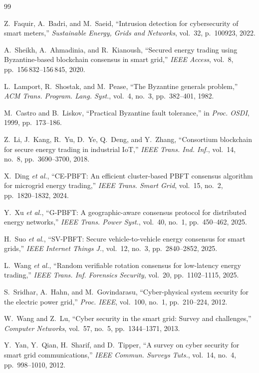 \documentclass[10pt,twocolumn,journal]{IEEEtran}
\begin{document}
\begin{thebibliography}{99}

Z.~Faquir, A.~Badri, and M.~Saeid, ``Intrusion detection for cybersecurity of smart meters,'' \emph{Sustainable Energy, Grids and Networks}, vol.~32, p.~100923, 2022.

A.~Sheikh, A.~Ahmadinia, and R.~Kianoush, ``Secured energy trading using Byzantine-based blockchain consensus in smart grid,'' \emph{IEEE Access}, vol.~8, pp.~156\,832--156\,845, 2020.

L.~Lamport, R.~Shostak, and M.~Pease, ``The Byzantine generals problem,'' \emph{ACM Trans. Program. Lang. Syst.}, vol.~4, no.~3, pp.~382--401, 1982.

M.~Castro and B.~Liskov, ``Practical Byzantine fault tolerance,'' in \emph{Proc. OSDI}, 1999, pp.~173--186.

Z.~Li, J.~Kang, R.~Yu, D.~Ye, Q.~Deng, and Y.~Zhang, ``Consortium blockchain for secure energy trading in industrial IoT,'' \emph{IEEE Trans. Ind. Inf.}, vol.~14, no.~8, pp.~3690--3700, 2018.

X.~Ding \emph{et al.}, ``CE-PBFT: An efficient cluster-based PBFT consensus algorithm for microgrid energy trading,'' \emph{IEEE Trans. Smart Grid}, vol.~15, no.~2, pp.~1820--1832, 2024.

Y.~Xu \emph{et al.}, ``G-PBFT: A geographic-aware consensus protocol for distributed energy networks,'' \emph{IEEE Trans. Power Syst.}, vol.~40, no.~1, pp.~450--462, 2025.

H.~Suo \emph{et al.}, ``SV-PBFT: Secure vehicle-to-vehicle energy consensus for smart grids,'' \emph{IEEE Internet Things J.}, vol.~12, no.~3, pp.~2840--2852, 2025.

L.~Wang \emph{et al.}, ``Random verifiable rotation consensus for low-latency energy trading,'' \emph{IEEE Trans. Inf. Forensics Security}, vol.~20, pp.~1102--1115, 2025.

S.~Sridhar, A.~Hahn, and M.~Govindarasu, ``Cyber-physical system security for the electric power grid,'' \emph{Proc. IEEE}, vol.~100, no.~1, pp.~210--224, 2012.

W.~Wang and Z.~Lu, ``Cyber security in the smart grid: Survey and challenges,'' \emph{Computer Networks}, vol.~57, no.~5, pp.~1344--1371, 2013.

Y.~Yan, Y.~Qian, H.~Sharif, and D.~Tipper, ``A survey on cyber security for smart grid communications,'' \emph{IEEE Commun. Surveys Tuts.}, vol.~14, no.~4, pp.~998--1010, 2012.

\end{thebibliography}
\end{document}
